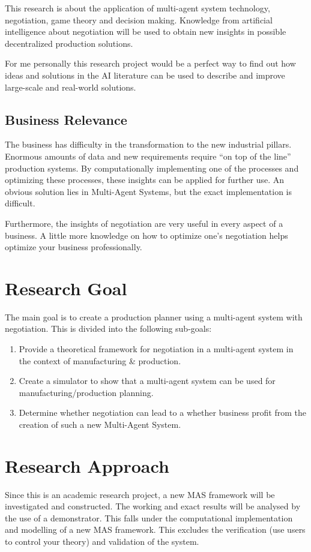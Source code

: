 This research is about the application of multi-agent system technology, negotiation, game theory and decision making. Knowledge from artificial intelligence about negotiation will be used to obtain new insights in possible decentralized production solutions. 

For me personally this research project would be a perfect way to find out how ideas and solutions in the AI literature can be used to describe and improve large-scale and real-world solutions.
\subsection{Business Relevance}
The business has difficulty in the transformation to the new industrial pillars. Enormous amounts of data and new requirements require ``on top of the line'' production systems. By computationally implementing one of the processes and optimizing these processes, these insights can be applied for further use. An obvious solution lies in Multi-Agent Systems, but the exact implementation is difficult.

Furthermore, the insights of negotiation are very useful in every aspect of a business. A little more knowledge on how to optimize one's negotiation helps optimize your business professionally.
\section{Research Goal}
The main goal is to create a production planner using a multi-agent system with negotiation. This is divided into the following sub-goals:
\begin{enumerate}
	\item
	Provide a theoretical framework for negotiation in a multi-agent system in the context of manufacturing \& production.
	\item
	Create a simulator to show that a multi-agent system can be used for manufacturing/production planning.
	\item
	Determine whether negotiation can lead to a whether business profit from the creation of such a new Multi-Agent System. 
\end{enumerate} 


\section{Research Approach}
Since this is an academic research project, a new MAS framework will be investigated and constructed. The working and exact results will be analysed by the use of a demonstrator. This falls under the computational implementation and modelling of a new MAS framework. This excludes the verification (use users to control your theory) and validation of the system.

